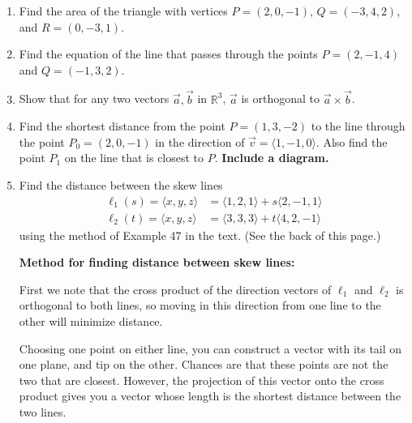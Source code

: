 \documentclass[12pt]{article}
\newcommand{\R}{\mathbb{R}}
\begin{document}
\begin{enumerate}

  
 \item Find the area of the triangle with vertices $P=(2,0,-1)$, $Q=(-3,4,2)$, and $R=(0,-3,1)$.

\vspace{2.5in}

\item Find the equation of the line that passes through the points $P=(2,-1,4)$ and $Q=(-1,3,2)$.

\vspace{2in}

 \item Show that for any two vectors $\vec{a},\vec{b}$ in $\R^3$, $\vec{a}$ is orthogonal to $\vec{a}\times\vec{b}$.
 
 
\newpage


\item Find the shortest distance from the point $P=(1,3,-2)$ to the line through the point $P_0 = (2,0,-1)$ in the direction of $\vec{v} = \langle 1, -1, 0\rangle$. Also find the point $P_1$ on the line that is closest to $P$. {\bf Include a diagram.}


\vspace{3.75in}

\item Find the distance between the skew lines 
\begin{align*}
 \ell_1(s) = \langle x,y,z\rangle & = \langle 1,2,1\rangle+s\langle 2,-1,1\rangle\\
 \ell_2(t) = \langle x,y,z\rangle & = \langle 3,3,3\rangle+t\langle 4,2,-1\rangle
\end{align*}
using the method of Example 47 in the text. (See the back of this page.)

\pagebreak

\textbf{Method for finding distance between skew lines:}

\medskip

First we note that the cross product of the direction vectors of $\ell_1$ and $\ell_2$ is orthogonal to both lines, so moving in this direction from one line to the other will minimize distance. 

Choosing one point on either line, you can construct a vector with its tail on one plane, and tip on the other. Chances are that these points are not the two that are closest. However, the projection of this vector onto the cross product gives you a vector whose length is  the shortest distance between the two lines.


\end{enumerate}
\end{document}
